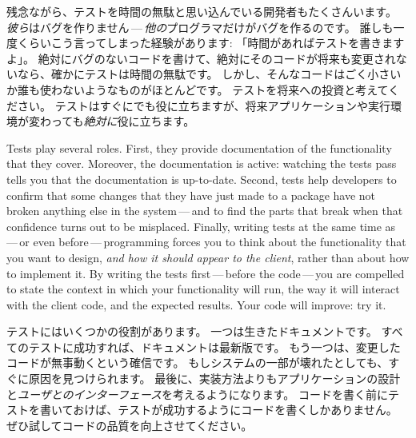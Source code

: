 \documentclass[a4paper,10pt,twoside]{book}
\begin{document}
残念ながら、テストを時間の無駄と思い込んでいる開発者もたくさんいます。
\emph{彼ら}はバグを作りません\,---\,\emph{他の}プログラマだけがバグを作るのです。
誰しも一度くらいこう言ってしまった経験があります: 「時間があればテストを書きますよ」。
絶対にバグのないコードを書けて、絶対にそのコードが将来も変更されないなら、確かにテストは時間の無駄です。
しかし、そんなコードはごく小さいか誰も使わないようなものがほとんどです。
テストを将来への投資と考えてください。
テストはすぐにでも役に立ちますが、将来アプリケーションや実行環境が変わっても\emph{絶対に}役に立ちます。

Tests play several roles. First, they provide documentation of the functionality that they cover.  
Moreover, the documentation is active: watching the tests pass tells you that the documentation is up-to-date.
Second,
tests help developers to confirm that some changes that they have just made to a package
have not broken anything else in the system\,---\,and to find the parts that break when that confidence turns out to be misplaced.
Finally, writing tests at the same time as\,---\,or even
before\,---\,programming forces you to think about the functionality
that you want to design, \emph{and how it should appear to the client}, 
rather than about how to implement it.
By writing the tests first\,---\,before the code\,---\,you are compelled to state
the context in which your functionality will run, the way it will
interact with the client code, and the expected results.  
Your code will improve: try it.
\fi

テストにはいくつかの役割があります。
一つは生きたドキュメントです。
すべてのテストに成功すれば、ドキュメントは最新版です。
もう一つは、変更したコードが無事動くという確信です。
もしシステムの一部が壊れたとしても、すぐに原因を見つけられます。
最後に、実装方法よりもアプリケーションの設計と\emph{ユーザとのインターフェース}を考えるようになります。
コードを書く前にテストを書いておけば、テストが成功するようにコードを書くしかありません。
ぜひ試してコードの品質を向上させてください。

\end{document}
